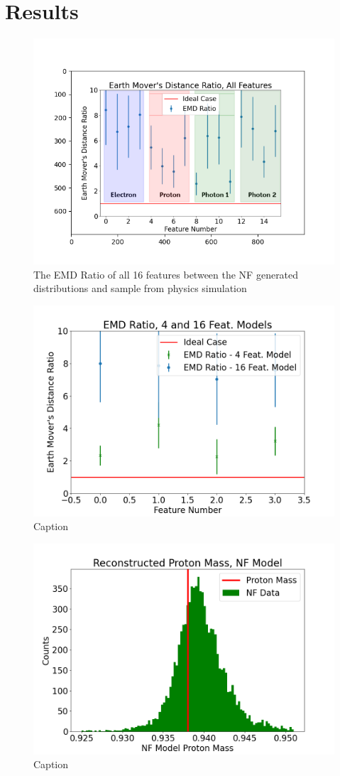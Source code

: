 \section{Results}
\begin{figure}
    \centering
    \includegraphics[width=.7\textwidth,trim={2.5cm 1.75cm 2cm 2.1cm},clip]{FinalPictures/EMD/nflow_emd_with_text.png}
    \caption{The EMD Ratio of all 16 features between the NF generated distributions and sample from physics simulation}
    \label{fig:my_label}
\end{figure}


\begin{figure}
    \centering
    \includegraphics[width=.7\textwidth,trim={ 0 0 0 0},clip]{FinalPictures/EMD/emdratio416.png}
    \caption{Caption}
    \label{fig:my_label}
\end{figure}

\begin{figure}
    \centering
    \includegraphics[width=.7\textwidth,trim={ 0 0 0 0},clip]{FinalPictures/protons}
    \caption{Caption}
    \label{fig:my_label}
\end{figure}

